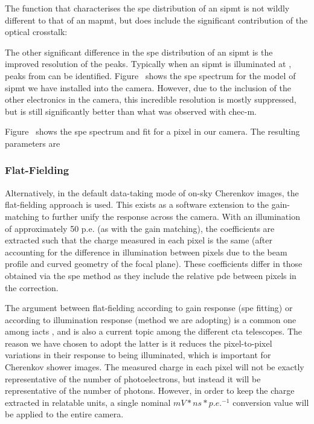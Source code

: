 The function that characterises the \gls{spe} distribution of an \gls{sipmt} is not wildly different to that of an \gls{mapmt}, but does include the significant contribution of the optical crosstalk:

The other significant difference in the \gls{spe} distribution of an \gls{sipmt} is the improved resolution of the peaks. Typically when an \gls{sipmt} is illuminated at , peaks from  can be identified. Figure~ shows the \gls{spe} spectrum for the model of \gls{sipmt} we have installed into the camera. However, due to the inclusion of the other electronics in the camera, this incredible resolution is mostly suppressed, but is still significantly better than what was observed with \gls{chec-m}.

Figure~ shows the \gls{spe} spectrum and fit for a pixel in our camera. The resulting parameters are 

\subsubsection{Flat-Fielding}

Alternatively, in the default data-taking mode of on-sky Cherenkov images, the flat-fielding approach is used. This exists as a software extension to the gain-matching to further unify the response across the camera. With an illumination of approximately 50 p.e. (as with the gain matching), the coefficients are extracted such that the charge measured in each pixel is the same (after accounting for the difference in illumination between pixels due to the beam profile and curved geometry of the focal plane). These coefficients differ in those obtained via the \gls{spe} method as they include the relative \gls{pde} between pixels in the correction. 

The argument between flat-fielding according to gain response (\gls{spe} fitting) or according to illumination response (method we are adopting) is a common one among \glspl{iact} , and is also a current topic among the different \gls{cta} telescopes. The reason we have chosen to adopt the latter is it reduces the pixel-to-pixel variations in their response to being illuminated, which is important for Cherenkov shower images. The measured charge in each pixel will not be exactly representative of the number of photoelectrons, but instead it will be representative of the number of photons. However, in order to keep the charge extracted in relatable units, a single nominal $mV*ns*p.e.^{-1}$ conversion value will be applied to the entire camera.

